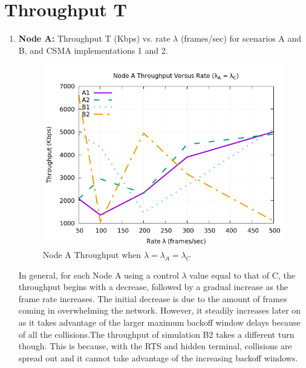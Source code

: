 \documentclass[12pt]{article}
\begin{document}
\section{Throughput T}

    \renewcommand{\labelenumi}{{\bf\alph{enumi})}}
    \begin{enumerate}
        \item { %
            {\bf Node A:} Throughput T (Kbps) vs. rate \(\lambda{}\) (frames/sec) for scenarios A and B, and CSMA implementations 1 and 2.
            
            \begin{figure}[!htb]
                \centering
                \includegraphics[width=5in]{1A.png}
                \caption{Node A Throughput when \(\lambda{} = \lambda{}_A = \lambda{}_C\) }
                \label{fig:1A}
            \end{figure}
            
            In general, for each Node A using a control \(\lambda{}\) value equal to that of C, the throughput begins with a decrease, followed by a gradual increase as the frame rate increases. The initial decrease is due to the amount of frames coming in overwhelming the network. However, it steadily increases later on as it takes advantage of the larger maximum backoff window delays because of all the collisions.The throughput of simulation B2 takes a different turn though. This is because, with the RTS and hidden terminal, collisions are spread out and it cannot take advantage of the increasing backoff windows.
        }
        
\clearpage


\end{enumerate}
\end{document}
